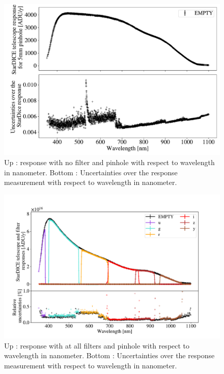 \begin{figure}[h]
    \centering
    \includegraphics[width=\columnwidth]{fig/stardice_5mm_response.pdf}
    \caption{Up : \SD response with no filter and \bpinhole pinhole with respect to wavelength in nanometer. Bottom : Uncertainties over the \SD response measurement with respect to wavelength in nanometer.}
    \label{fig:stardice_5mm_response}
\end{figure}

\begin{figure}[h]
    \centering
    \includegraphics[width=\columnwidth]{fig/stardice_75um_response.pdf}
    \caption{Up : \SD response with at all filters and \spinhole pinhole with respect to wavelength in nanometer. Bottom : Uncertainties over the \SD response measurement with respect to wavelength in nanometer.}
    \label{fig:stardice_75um_response}
\end{figure}

